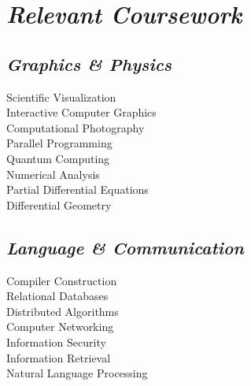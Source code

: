 \documentclass[11pt]{article}
\begin{document}
\begin{minipage}{250pt}
\section*{\it Relevant Coursework}
\subsection*{\it Graphics \& Physics}
Scientific Visualization\\
Interactive Computer Graphics\\
Computational Photography\\
Parallel Programming\\
Quantum Computing\\
Numerical Analysis\\
Partial Differential Equations\\
Differential Geometry

\subsection*{\it Language \& Communication}
Compiler Construction\\
Relational Databases\\
Distributed Algorithms\\
Computer Networking\\
Information Security\\
Information Retrieval\\
Natural Language Processing

\end{minipage}
\end{document}
